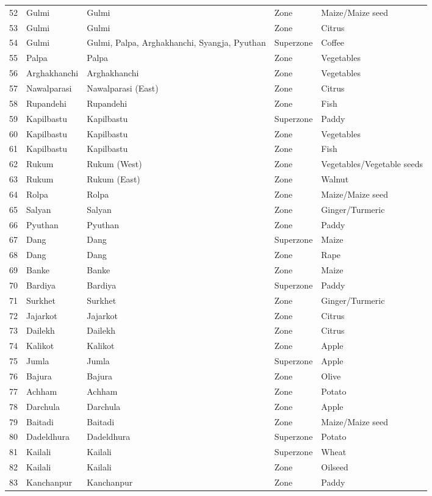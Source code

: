 \documentclass[]{article}
\begin{document}
\begin{longtable}{lllll}
52 & Gulmi & Gulmi & Zone & Maize/Maize seed\\
53 & Gulmi & Gulmi & Zone & Citrus\\
54 & Gulmi & Gulmi, Palpa, Arghakhanchi, Syangja, Pyuthan & Superzone & Coffee\\
55 & Palpa & Palpa & Zone & Vegetables\\
56 & Arghakhanchi & Arghakhanchi & Zone & Vegetables\\
57 & Nawalparasi & Nawalparasi (East) & Zone & Citrus\\
58 & Rupandehi & Rupandehi & Zone & Fish\\
59 & Kapilbastu & Kapilbastu & Superzone & Paddy\\
60 & Kapilbastu & Kapilbastu & Zone & Vegetables\\
61 & Kapilbastu & Kapilbastu & Zone & Fish\\
62 & Rukum & Rukum (West) & Zone & Vegetables/Vegetable seeds\\
63 & Rukum & Rukum (East) & Zone & Walnut\\
64 & Rolpa & Rolpa & Zone & Maize/Maize seed\\
65 & Salyan & Salyan & Zone & Ginger/Turmeric\\
66 & Pyuthan & Pyuthan & Zone & Paddy\\
67 & Dang & Dang & Superzone & Maize\\
68 & Dang & Dang & Zone & Rape\\
69 & Banke & Banke & Zone & Maize\\
70 & Bardiya & Bardiya & Superzone & Paddy\\
71 & Surkhet & Surkhet & Zone & Ginger/Turmeric\\
72 & Jajarkot & Jajarkot & Zone & Citrus\\
73 & Dailekh & Dailekh & Zone & Citrus\\
74 & Kalikot & Kalikot & Zone & Apple\\
75 & Jumla & Jumla & Superzone & Apple\\
76 & Bajura & Bajura & Zone & Olive\\
77 & Achham & Achham & Zone & Potato\\
78 & Darchula & Darchula & Zone & Apple\\
79 & Baitadi & Baitadi & Zone & Maize/Maize seed\\
80 & Dadeldhura & Dadeldhura & Superzone & Potato\\
81 & Kailali & Kailali & Superzone & Wheat\\
82 & Kailali & Kailali & Zone & Oilseed\\
83 & Kanchanpur & Kanchanpur & Zone & Paddy\\*
\end{longtable}

\endgroup{}
\end{document}
